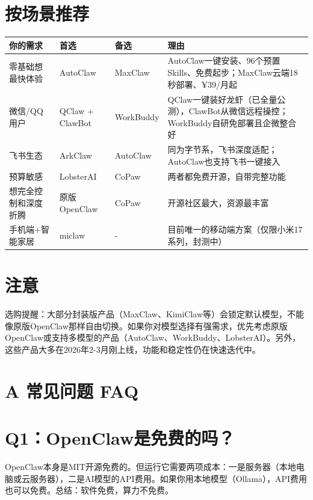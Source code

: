 \documentclass[
  10
]{article}
\newcounter{none} %
\begin{document}
\section{按场景推荐}\label{ux6309ux573aux666fux63a8ux8350}

{\def\LTcaptype{none} %
\begin{longtable}[]{@{}|l|l|l|l|@{}}
\toprule\noalign{}
\endhead
\bottomrule\noalign{}
\endlastfoot
\hline
你的需求 & 首选 & 备选 & 理由 \\
\hline
零基础想最快体验 & AutoClaw & MaxClaw &
AutoClaw一键安装、96个预置Skills、免费起步；MaxClaw云端18秒部署、¥39/月起 \\
\hline
微信/QQ用户 & QClaw + ClawBot & WorkBuddy &
QClaw一键装好龙虾（已全量公测），ClawBot从微信远程操控；WorkBuddy自研免部署且企微整合好 \\
\hline
飞书生态 & ArkClaw & AutoClaw &
同为字节系，飞书深度适配；AutoClaw也支持飞书一键接入 \\
\hline
预算敏感 & LobsterAI & CoPaw & 两者都免费开源，自带完整功能 \\
\hline
想完全控制和深度折腾 & 原版OpenClaw & CoPaw &
开源社区最大，资源最丰富 \\
\hline
手机端+智能家居 & miclaw & - &
目前唯一的移动端方案（仅限小米17系列，封测中） \\
\hline
\end{longtable}
}

\section{注意}\label{ux6ce8ux610f-28}

选购提醒：大部分封装版产品（MaxClaw、KimiClaw等）会锁定默认模型，不能像原版OpenClaw那样自由切换。如果你对模型选择有强需求，优先考虑原版OpenClaw或支持多模型的产品（AutoClaw、WorkBuddy、LobsterAI）。另外，这些产品大多在2026年2-3月刚上线，功能和稳定性仍在快速迭代中。

\section{A 常见问题 FAQ}\label{a-ux5e38ux89c1ux95eeux9898-faq}

\section{Q1：OpenClaw是免费的吗？}\label{q1openclawux662fux514dux8d39ux7684ux5417}

OpenClaw本身是MIT开源免费的。但运行它需要两项成本：一是服务器（本地电脑或云服务器），二是AI模型的API费用。如果你用本地模型（Ollama），API费用也可以免费。总结：软件免费，算力不免费。
\end{document}
